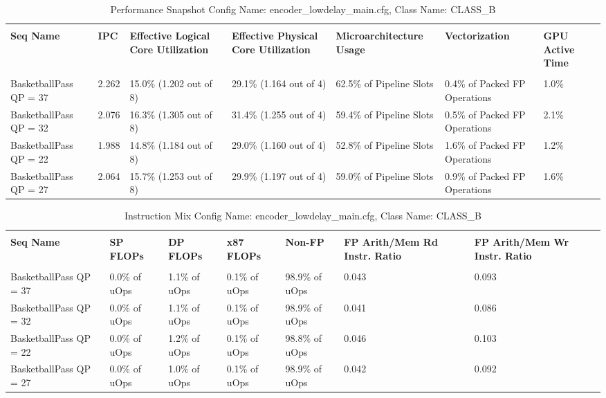 \documentclass{article}%
\begin{document}
\begin{longtabu}{| X[l] | X[l] | X[l] | X[l] | X[l] | X[l] | X[l] |}%
\caption{%
Performance Snapshot\newline%
 Config Name: encoder\_lowdelay\_main.cfg,\newline%
 Class Name: CLASS\_B\newline%
%
}%
\hline%
&&&&&&\\%
\textbf{Seq Name}&\textbf{IPC}&\textbf{Effective Logical Core Utilization}&\textbf{Effective Physical Core Utilization}&\textbf{Microarchitecture Usage}&\textbf{Vectorization}&\textbf{GPU Active Time}\\%
&&&&&&\\%
\hline%
\endhead%
BasketballPass\newline%
 QP = 37&2.262&15.0\% (1.202 out of 8)&29.1\% (1.164 out of 4)&62.5\% of Pipeline Slots&0.4\% of Packed FP Operations&1.0\%\\%
\hline%
BasketballPass\newline%
 QP = 32&2.076&16.3\% (1.305 out of 8)&31.4\% (1.255 out of 4)&59.4\% of Pipeline Slots&0.5\% of Packed FP Operations&2.1\%\\%
\hline%
BasketballPass\newline%
 QP = 22&1.988&14.8\% (1.184 out of 8)&29.0\% (1.160 out of 4)&52.8\% of Pipeline Slots&1.6\% of Packed FP Operations&1.2\%\\%
\hline%
BasketballPass\newline%
 QP = 27&2.064&15.7\% (1.253 out of 8)&29.9\% (1.197 out of 4)&59.0\% of Pipeline Slots&0.9\% of Packed FP Operations&1.6\%\\%
\hline%
\end{longtabu}%
\begin{longtabu}{| X[l] | X[l] | X[l] | X[l] | X[l] | X[l] | X[l] |}%
\caption{%
Instruction Mix\newline%
 Config Name: encoder\_lowdelay\_main.cfg,\newline%
 Class Name: CLASS\_B\newline%
%
}%
\hline%
&&&&&&\\%
\textbf{Seq Name}&\textbf{SP FLOPs}&\textbf{DP FLOPs}&\textbf{x87 FLOPs}&\textbf{Non{-}FP}&\textbf{FP Arith/Mem Rd Instr. Ratio}&\textbf{FP Arith/Mem Wr Instr. Ratio}\\%
&&&&&&\\%
\hline%
\endhead%
BasketballPass\newline%
 QP = 37&0.0\% of uOps&1.1\% of uOps&0.1\% of uOps&98.9\% of uOps&0.043&0.093\\%
\hline%
BasketballPass\newline%
 QP = 32&0.0\% of uOps&1.1\% of uOps&0.1\% of uOps&98.9\% of uOps&0.041&0.086\\%
\hline%
BasketballPass\newline%
 QP = 22&0.0\% of uOps&1.2\% of uOps&0.1\% of uOps&98.8\% of uOps&0.046&0.103\\%
\hline%
BasketballPass\newline%
 QP = 27&0.0\% of uOps&1.0\% of uOps&0.1\% of uOps&98.9\% of uOps&0.042&0.092\\%
\hline%
\end{longtabu}%
\end{document}
